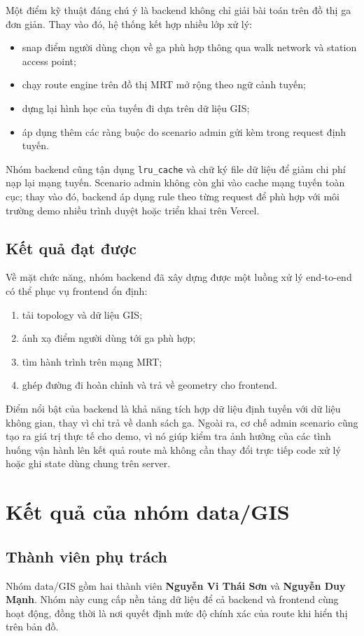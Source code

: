 ﻿\documentclass[../DoAn.tex]{subfiles}
\begin{document}
Một điểm kỹ thuật đáng chú ý là backend không chỉ giải bài toán trên đồ thị ga đơn giản. Thay vào đó, hệ thống kết hợp nhiều lớp xử lý:
\begin{itemize}
    \item snap điểm người dùng chọn về ga phù hợp thông qua walk network và station access point;
    \item chạy route engine trên đồ thị MRT mở rộng theo ngữ cảnh tuyến;
    \item dựng lại hình học của tuyến đi dựa trên dữ liệu GIS;
    \item áp dụng thêm các ràng buộc do scenario admin gửi kèm trong request định tuyến.
\end{itemize}

Nhóm backend cũng tận dụng \texttt{lru\_cache} và chữ ký file dữ liệu để giảm chi phí nạp lại mạng tuyến. Scenario admin không còn ghi vào cache mạng tuyến toàn cục; thay vào đó, backend áp dụng rule theo từng request để phù hợp với môi trường demo nhiều trình duyệt hoặc triển khai trên Vercel.

\subsection{Kết quả đạt được}
Về mặt chức năng, nhóm backend đã xây dựng được một luồng xử lý end-to-end có thể phục vụ frontend ổn định:
\begin{enumerate}
    \item tải topology và dữ liệu GIS;
    \item ánh xạ điểm người dùng tới ga phù hợp;
    \item tìm hành trình trên mạng MRT;
    \item ghép đường đi hoàn chỉnh và trả về geometry cho frontend.
\end{enumerate}

Điểm nổi bật của backend là khả năng tích hợp dữ liệu định tuyến với dữ liệu không gian, thay vì chỉ trả về danh sách ga. Ngoài ra, cơ chế admin scenario cũng tạo ra giá trị thực tế cho demo, vì nó giúp kiểm tra ảnh hưởng của các tình huống vận hành lên kết quả route mà không cần thay đổi trực tiếp code xử lý hoặc ghi state dùng chung trên server.


\section{Kết quả của nhóm data/GIS}
\subsection{Thành viên phụ trách}
Nhóm data/GIS gồm hai thành viên \textbf{Nguyễn Vi Thái Sơn} và \textbf{Nguyễn Duy Mạnh}. Nhóm này cung cấp nền tảng dữ liệu để cả backend và frontend cùng hoạt động, đồng thời là nơi quyết định mức độ chính xác của route khi hiển thị trên bản đồ.
\end{document}
